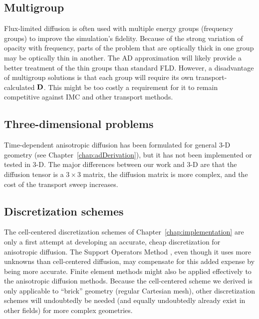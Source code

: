\subsection{Multigroup}

Flux-limited diffusion is often used with multiple energy groups (frequency
groups) to improve the simulation's fidelity.
Because of the strong variation of opacity with
frequency, parts of the problem that are optically thick in one group may be optically
thin in another. The AD approximation will likely provide a better treatment of
the thin groups than standard FLD. However, a disadvantage of multigroup solutions is that
each group will require its own transport-calculated $\mathbf{D}$. This might be
too costly a requirement for it to remain competitive against IMC and other
transport methods.

\subsection{Three-dimensional problems}

Time-dependent anisotropic diffusion has been formulated for general
3-D geometry (see Chapter~\ref{chap:adDerivation}), but it has not
been implemented or tested in 3-D. The major differences between our work
and 3-D are that the
diffusion tensor is a $3\times 3$ matrix, the diffusion matrix is more
complex, and the cost of the transport sweep increases.

\subsection{Discretization schemes}

The cell-centered discretization schemes of Chapter~\ref{chap:implementation}
are only a first attempt at developing an accurate, cheap discretization for
anisotropic diffusion. The Support Operators Method
\cite{Mor1998,Run2006}, even though it uses more unknowns than
cell-centered diffusion, may compensate for this added expense by being more accurate. Finite element
methods might also be applied effectively to the anisotropic diffusion methods.
Because the cell-centered scheme we derived is only applicable to ``brick''
geometry (regular Cartesian mesh), other discretization schemes will undoubtedly
be needed (and equally undoubtedly already exist in other fields) for more
complex geometries.

